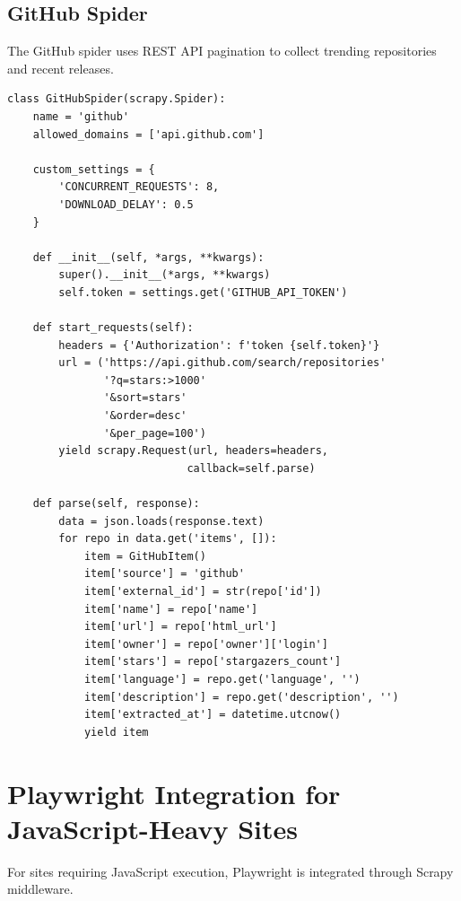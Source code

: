 \documentclass[12pt,a4paper]{report}
\begin{document}
\subsection{GitHub Spider}

The GitHub spider uses REST API pagination to collect trending repositories and recent releases.

\begin{lstlisting}
class GitHubSpider(scrapy.Spider):
    name = 'github'
    allowed_domains = ['api.github.com']
    
    custom_settings = {
        'CONCURRENT_REQUESTS': 8,
        'DOWNLOAD_DELAY': 0.5
    }
    
    def __init__(self, *args, **kwargs):
        super().__init__(*args, **kwargs)
        self.token = settings.get('GITHUB_API_TOKEN')
    
    def start_requests(self):
        headers = {'Authorization': f'token {self.token}'}
        url = ('https://api.github.com/search/repositories'
               '?q=stars:>1000'
               '&sort=stars'
               '&order=desc'
               '&per_page=100')
        yield scrapy.Request(url, headers=headers, 
                            callback=self.parse)
    
    def parse(self, response):
        data = json.loads(response.text)
        for repo in data.get('items', []):
            item = GitHubItem()
            item['source'] = 'github'
            item['external_id'] = str(repo['id'])
            item['name'] = repo['name']
            item['url'] = repo['html_url']
            item['owner'] = repo['owner']['login']
            item['stars'] = repo['stargazers_count']
            item['language'] = repo.get('language', '')
            item['description'] = repo.get('description', '')
            item['extracted_at'] = datetime.utcnow()
            yield item
\end{lstlisting}

\section{Playwright Integration for JavaScript-Heavy Sites}

For sites requiring JavaScript execution, Playwright is integrated through Scrapy middleware.
\end{document}
